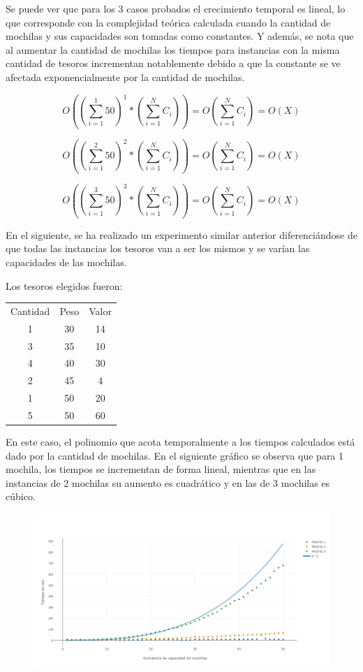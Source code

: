 Se puede ver que para los 3 casos probados el crecimiento temporal es lineal, lo que corresponde con la complejidad teórica calculada cuando la cantidad de mochilas y sus capacidades son tomadas como constantes. Y además, se nota que al aumentar la cantidad de mochilas los tiempos para instancias con la misma cantidad de tesoros incrementan notablemente debido a que la constante se ve afectada exponencialmente por la cantidad de mochilas.

$$O\left(\left(\sum_{i=1}^{1}{50}\right)^{1}*\left(\sum_{i=1}^{N}{C_i}\right)\right) = O\left(\sum_{i=1}^{N}{C_i}\right) = 
O\left(X\right)$$


$$
O\left(\left(\sum_{i=1}^{2}{50}\right)^{2}*\left(\sum_{i=1}^{N}{C_i}\right)\right) = O\left(\sum_{i=1}^{N}{C_i}\right) = O\left(X\right)$$

$$O\left(\left(\sum_{i=1}^{3}{50}\right)^{3}*\left(\sum_{i=1}^{N}{C_i}\right)\right) = O\left(\sum_{i=1}^{N}{C_i}\right) = O\left(X\right)$$

En el siguiente, se ha realizado un experimento similar anterior diferenciándose de que todas las instancias los tesoros van a ser los mismos y se varían las capacidades de las mochilas. 

Los tesoros elegidos fueron:

\begin{tabular}{ c c c }
    Cantidad & Peso & Valor \\
    1 & 30 & 14 \\
    3 & 35 & 10 \\
    4 & 40 & 30 \\
    2 & 45 & 4 \\
    1 & 50 & 20 \\
    5 & 50 & 60 \\
\end{tabular}
 
						

En este caso, el polinomio que acota temporalmente a los tiempos calculados está dado por la cantidad de mochilas. En el siguiente gráfico se observa que para 1 mochila, los tiempos se incrementan de forma lineal, mientras que en las instancias de 2 mochilas su aumento es cuadrático y en las de 3 mochilas es cúbico.

\begin{figure}[H]
    \centering
    \includegraphics[width=\textwidth]{./imagenes/3-2.png}

\end{figure}

